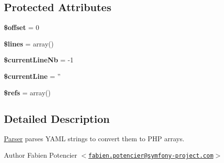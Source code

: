 \subsection*{\-Protected \-Attributes}
\begin{DoxyCompactItemize}
\item 
\hypertarget{class_symfony_1_1_component_1_1_yaml_1_1_parser_aec4de82415d7f05cb9748d12d3a95a87}{
{\bfseries \$offset} = 0}
\label{class_symfony_1_1_component_1_1_yaml_1_1_parser_aec4de82415d7f05cb9748d12d3a95a87}

\item 
\hypertarget{class_symfony_1_1_component_1_1_yaml_1_1_parser_a470f99c17f2e6f0a5a7b96f44cfc46a5}{
{\bfseries \$lines} = array()}
\label{class_symfony_1_1_component_1_1_yaml_1_1_parser_a470f99c17f2e6f0a5a7b96f44cfc46a5}

\item 
\hypertarget{class_symfony_1_1_component_1_1_yaml_1_1_parser_ac1ceccab6204b114cb80206c8bc45f61}{
{\bfseries \$current\-Line\-Nb} = -\/1}
\label{class_symfony_1_1_component_1_1_yaml_1_1_parser_ac1ceccab6204b114cb80206c8bc45f61}

\item 
\hypertarget{class_symfony_1_1_component_1_1_yaml_1_1_parser_ab86be58497f4553475dd9234304c7014}{
{\bfseries \$current\-Line} = ''}
\label{class_symfony_1_1_component_1_1_yaml_1_1_parser_ab86be58497f4553475dd9234304c7014}

\item 
\hypertarget{class_symfony_1_1_component_1_1_yaml_1_1_parser_a8f8757e72f75875c4520aa66624dfae2}{
{\bfseries \$refs} = array()}
\label{class_symfony_1_1_component_1_1_yaml_1_1_parser_a8f8757e72f75875c4520aa66624dfae2}

\end{DoxyCompactItemize}


\subsection{\-Detailed \-Description}
\hyperlink{class_symfony_1_1_component_1_1_yaml_1_1_parser}{\-Parser} parses \-Y\-A\-M\-L strings to convert them to \-P\-H\-P arrays.

\begin{DoxyAuthor}{\-Author}
\-Fabien \-Potencier $<$\href{mailto:fabien.potencier@symfony-project.com}{\tt fabien.\-potencier@symfony-\/project.\-com}$>$ 
\end{DoxyAuthor}


